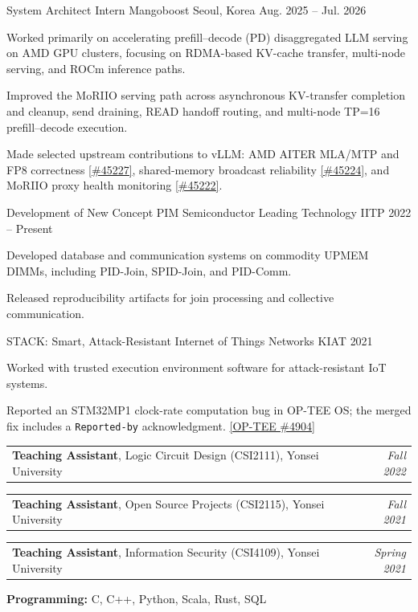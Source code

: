 \documentclass[10pt, a4paper]{awesome-cv}
\makeatletter
\newcommand{\teachingentry}[3]{%
  \noindent\begin{tabular*}{\textwidth}{@{\extracolsep{\fill}}l r}
    \textbf{#1}, #2 & \textit{#3}
  \end{tabular*}\par
}
\makeatother
\begin{document}
\begin{cventries}
  \cventry
    {System Architect Intern}
    {Mangoboost}
    {Seoul, Korea}
    {Aug. 2025 -- Jul. 2026}
    {\begin{cvitems}
      \item Worked primarily on accelerating prefill--decode (PD) disaggregated LLM serving on AMD GPU clusters, focusing on RDMA-based KV-cache transfer, multi-node serving, and ROCm inference paths.
      \item Improved the MoRIIO serving path across asynchronous KV-transfer completion and cleanup, send draining, READ handoff routing, and multi-node TP=16 prefill--decode execution.
      \item Made selected upstream contributions to vLLM: AMD AITER MLA/MTP and FP8 correctness \href{https://github.com/vllm-project/vllm/pull/45227}{[\#45227]}, shared-memory broadcast reliability \href{https://github.com/vllm-project/vllm/pull/45224}{[\#45224]}, and MoRIIO proxy health monitoring \href{https://github.com/vllm-project/vllm/pull/45222}{[\#45222]}.
    \end{cvitems}}
\end{cventries}

\begin{cventries}
  \cventry
    {}
    {Development of New Concept PIM Semiconductor Leading Technology}
    {IITP}
    {2022 -- Present}
    {\begin{cvitems}
      \item Developed database and communication systems on commodity UPMEM DIMMs, including PID-Join, SPID-Join, and PID-Comm.
      \item Released reproducibility artifacts for join processing and collective communication.
    \end{cvitems}}
  \cventry
    {}
    {STACK: Smart, Attack-Resistant Internet of Things Networks}
    {KIAT}
    {2021}
    {\begin{cvitems}
      \item Worked with trusted execution environment software for attack-resistant IoT systems.
      \item Reported an STM32MP1 clock-rate computation bug in OP-TEE OS; the merged fix includes a \texttt{Reported-by} acknowledgment. \href{https://github.com/OP-TEE/optee_os/pull/4904}{[OP-TEE \#4904]}
    \end{cvitems}}
\end{cventries}

\begin{cvparagraph}
  \teachingentry{Teaching Assistant}{Logic Circuit Design (CSI2111), Yonsei University}{Fall 2022}
  \teachingentry{Teaching Assistant}{Open Source Projects (CSI2115), Yonsei University}{Fall 2021}
  \teachingentry{Teaching Assistant}{Information Security (CSI4109), Yonsei University}{Spring 2021}
\end{cvparagraph}

\begin{cvparagraph}
\textbf{Programming:} C, C++, Python, Scala, Rust, SQL
\end{cvparagraph}
\end{document}
